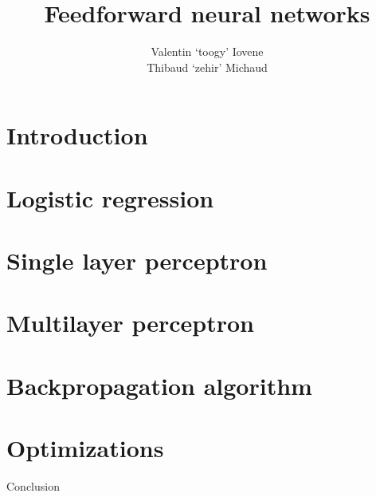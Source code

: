 \documentclass{beamer}
\title{Feedforward neural networks}
\author{Valentin `toogy' Iovene\\
Thibaud `zehir' Michaud}
\begin{document}
\maketitle

\section{Introduction}


\section{Logistic regression}


\section{Single layer perceptron}


\section{Multilayer perceptron}


\section{Backpropagation algorithm}


\section{Optimizations}


\begin{frame}
  \begin{center}
    \Large{Conclusion}
  \end{center}
\end{frame}
\end{document}
